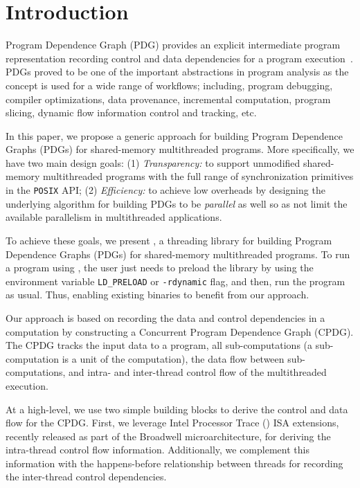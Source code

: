 \section{Introduction}
\label{sec:introduction}

Program Dependence Graph (PDG) provides an explicit intermediate program representation recording control and data dependencies for a program execution~\cite{pdg-pingali}. PDGs proved to be one of the important abstractions in program analysis as the concept is used for a wide range of workflows; including, program debugging, compiler optimizations, data provenance, incremental computation, program slicing, dynamic flow information control and tracking,  etc.


In this paper, we propose a generic approach for building Program Dependence Graphs (PDGs)  for shared-memory multithreaded programs. More specifically, we have two main design goals: (1) {\em Transparency:} to support unmodified shared-memory multithreaded programs with the full range of synchronization primitives in the {\tt POSIX} API; (2) {\em Efficiency:} to achieve low overheads by designing the underlying algorithm for building PDGs to be  {\em parallel} as well so as not limit the available parallelism in multithreaded applications.


To achieve these goals, we present \projecttitle, a threading library for building Program Dependence Graphs (PDGs) for shared-memory multithreaded programs. To run a program using \projecttitle,  the user just needs to preload the \projecttitle library  by using the environment variable {\tt LD\_PRELOAD} or {\tt -rdynamic} flag, and then, run the program as usual. Thus, enabling existing binaries to benefit from our approach. 


Our approach is based on recording the data and control dependencies in a computation by constructing a Concurrent Program Dependence Graph (CPDG). The CPDG tracks the input data to a program, all sub-computations (a sub-computation is a unit of the computation), the data flow between sub-computations, and intra- and inter-thread control flow of the multithreaded execution.


At a high-level, we use two simple building blocks to derive the control and data flow for the CPDG. First, we leverage Intel Processor Trace (\intelpt) ISA extensions, recently released as part of the Broadwell microarchitecture, for deriving the intra-thread control flow information. Additionally, we complement this  information with the happens-before relationship between threads for recording the inter-thread control dependencies. 

